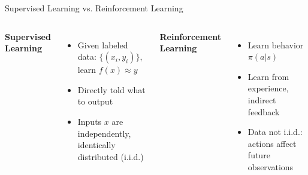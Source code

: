 \begin{frame}{Supervised Learning vs. Reinforcement Learning}
    \begin{columns}[T]
            \textbf{Supervised Learning}
            \begin{itemize}
                \setlength{\itemsep}{1.5em}
                \item Given labeled data: $\{(x_i, y_i)\}$, learn $f(x) \approx y$
                \item Directly told what to output
                \item Inputs $x$ are independently, identically distributed (i.i.d.)
            \end{itemize}
            \textbf{Reinforcement Learning}
            \begin{itemize}
                \setlength{\itemsep}{1.5em}
                \item Learn behavior $\pi(a|s)$
                \item Learn from experience, indirect feedback
                \item Data not i.i.d.: actions affect future observations
            \end{itemize}
    \end{columns}
\end{frame}

